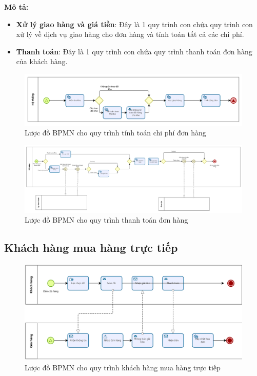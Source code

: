     \newpage
    \textbf{Mô tả:}
    \begin{itemize}
        \item \textbf{Xử lý giao hàng và giá tiền}: Đây là 1 quy trình con chứa quy trình con xử lý về dịch vụ giao hàng cho đơn hàng và tính toán tất cả các chi phí.
        \item \textbf{Thanh toán}: Đây là 1 quy trình con chứa quy trình thanh toán đơn hàng của khách hàng.
    \end{itemize}
    \begin{figure}[!htp]
        \centering
        \includegraphics[width=5in]{img/BPMN/customer_buy/customer_calc_fee.png}
        \newline
        \caption{Lược đồ BPMN cho quy trình tính toán chi phí đơn hàng}
    \end{figure}
    \begin{figure}[!htp]
        \centering
        \includegraphics[width=17cm]{img/BPMN/customer_buy/customer_payment.png}
        \newline
        \caption{Lược đồ BPMN cho quy trình thanh toán đơn hàng}
    \end{figure}

\subsection{Khách hàng mua hàng trực tiếp}
\begin{figure}[!htp]
    \centering
    \includegraphics[width=14cm]{img/BPMN/Hien/Customer_buyOffline.png}
    \newline
    \caption{Lược đồ BPMN cho quy trình khách hàng mua hàng trực tiếp}
\end{figure}

